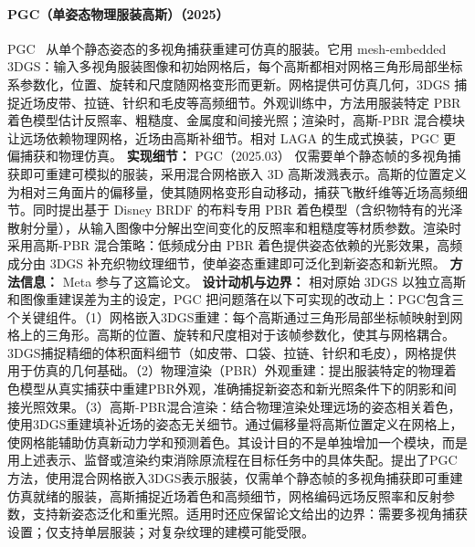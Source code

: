 \paragraph{PGC（单姿态物理服装高斯）（2025）}
PGC~\cite{2503_20779} 从单个静态姿态的多视角捕获重建可仿真的服装。它用 mesh-embedded 3DGS：输入多视角服装图像和初始网格后，每个高斯都相对网格三角形局部坐标系参数化，位置、旋转和尺度随网格变形而更新。网格提供可仿真几何，3DGS 捕捉近场皮带、拉链、针织和毛皮等高频细节。外观训练中，方法用服装特定 PBR 着色模型估计反照率、粗糙度、金属度和间接光照；渲染时，高斯-PBR 混合模块让远场依赖物理网格，近场由高斯补细节。相对 LAGA 的生成式换装，PGC 更偏捕获和物理仿真。
\textbf{实现细节：} PGC（2025.03） 仅需要单个静态帧的多视角捕获即可重建可模拟的服装，采用混合网格嵌入 3D 高斯泼溅表示。高斯的位置定义为相对三角面片的偏移量，使其随网格变形自动移动，捕获飞散纤维等近场高频细节。同时提出基于 Disney BRDF 的布料专用 PBR 着色模型（含织物特有的光泽散射分量），从输入图像中分解出空间变化的反照率和粗糙度等材质参数。渲染时采用高斯-PBR 混合策略：低频成分由 PBR 着色提供姿态依赖的光影效果，高频成分由 3DGS 补充织物纹理细节，使单姿态重建即可泛化到新姿态和新光照。
\textbf{方法信息：} Meta 参与了这篇论文。
\textbf{设计动机与边界：} 相对原始 3DGS 以独立高斯和图像重建误差为主的设定，PGC 把问题落在以下可实现的改动上：PGC包含三个关键组件。（1）网格嵌入3DGS重建：每个高斯通过三角形局部坐标帧映射到网格上的三角形。高斯的位置、旋转和尺度相对于该帧参数化，使其与网格耦合。3DGS捕捉精细的体积面料细节（如皮带、口袋、拉链、针织和毛皮），网格提供用于仿真的几何基础。（2）物理渲染（PBR）外观重建：提出服装特定的物理着色模型从真实捕获中重建PBR外观，准确捕捉新姿态和新光照条件下的阴影和间接光照效果。（3）高斯-PBR混合渲染：结合物理渲染处理远场的姿态相关着色，使用3DGS重建填补近场的姿态无关细节。通过偏移量将高斯位置定义在网格上，使网格能辅助仿真新动力学和预测着色。其设计目的不是单独增加一个模块，而是用上述表示、监督或渲染约束消除原流程在目标任务中的具体失配。提出了PGC方法，使用混合网格嵌入3DGS表示服装，仅需单个静态帧的多视角捕获即可重建仿真就绪的服装，高斯捕捉近场着色和高频细节，网格编码远场反照率和反射参数，支持新姿态泛化和重光照。适用时还应保留论文给出的边界：需要多视角捕获设置；仅支持单层服装；对复杂纹理的建模可能受限。
